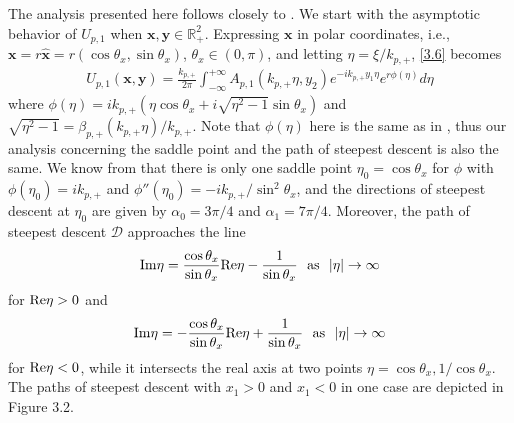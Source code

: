 \documentclass[final,reqno]{siamltex}
\newcommand{\I}{{\rm Im}}
\newcommand{\Rt}{{\rm Re}}
\newcommand{\mat}{\mathbb}
\newcommand{\R}{{\mat R}}
\newcommand{\be}{\begin{eqnarray}}
\newcommand{\en}{\end{eqnarray}}
\begin{document}
The analysis presented here follows closely to \cite[Section 2.3.4]{CP17}. We start with the asymptotic behavior of $U_{p,1}$ when $\mathbf{x},\mathbf{y}\in\R^2_+$. Expressing $\mathbf{x}$ in polar coordinates, i.e., $\mathbf{x}=r\hat{\mathbf{x}}=r(\cos\theta_x,\sin\theta_x)$, $\theta_x\in(0,\pi)$, and letting $\eta=\xi/k_{p,+}$, \eqref{3.6} becomes 
\be\label{3.7}
  U_{p,1}(\mathbf{x},\mathbf{y})=\frac{k_{p,+}}{2\pi}\int_{-\infty}^{+\infty}A_{p,1}(k_{p,+}\eta,y_2)e^{-ik_{p,+}y_1\eta}e^{r\phi(\eta)}d\eta
\en
where $\phi(\eta)=ik_{p,+}(\eta\cos\theta_x+i\sqrt{\eta^2-1}\sin\theta_x)$ and $\sqrt{\eta^2-1}=\beta_{p,+}(k_{p,+}\eta)/k_{p,+}$. Note that $\phi(\eta)$ here is the same as in \cite[Section 2.3.4]{CP17}, thus our analysis concerning the saddle point and the path of steepest descent is also the same. We know from \cite{CP17} that there is only one saddle point $\eta_0=\cos\theta_x$ for $\phi$ with $\phi(\eta_0)=ik_{p,+}$ and $\phi''(\eta_0)=-ik_{p,+}/\sin^2\theta_x$, and the directions of steepest descent at $\eta_0$ are given by $\alpha_0=3\pi/4$ and $\alpha_1=7\pi/4$. Moreover, the path of steepest descent $\mathcal{D}$ approaches the line 
$$
  \I\eta=\frac{\cos\theta_x}{\sin\theta_x}\Rt\eta-\frac{1}{\sin\theta_x}~~{\rm as}~~|\eta|\rightarrow\infty
$$
for $\Rt\eta>0$ and  
$$
\I\eta=-\frac{\cos\theta_x}{\sin\theta_x}\Rt\eta+\frac{1}{\sin\theta_x}~~{\rm as}~~|\eta|\rightarrow\infty
$$
for $\Rt\eta<0$, while it intersects the real axis at two points $\eta=\cos\theta_x,1/\cos\theta_x$. The paths of steepest descent with $x_1>0$ and $x_1<0$ in one case are depicted in Figure 3.2. 
\end{document}
